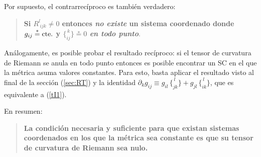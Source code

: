 Por supuesto, el contrarrecíproco es también verdadero:
\begin{quotation}
\textbf{Si $R_{\ ijk}^l\neq0$
entonces \textit{no existe} un sistema coordenado donde $g_{ij}\overset{\ast}{=}{\rm
cte.}$ y $\{ _{ i j}^{\, k}\} \overset{\ast}{=}0$ \textit{en todo punto}}.
\end{quotation}

Análogamente, es posible probar el resultado recíproco: si el tensor de curvatura de Riemann se anula en todo punto entonces es posible encontrar un SC en el que la métrica asuma valores constantes. Para esto, basta aplicar el resultado visto al final de la sección (\ref{sec:RT}) y la identidad $\partial_kg_{ij}\equiv g_{il}\,\{^{\, l} _{jk}\}+g_{jl}\,\{^{\, l} _{ik}\}$, que es equivalente a (\ref{tI1}).

En resumen:
\begin{quotation}
\textbf{La condición necesaria y suficiente para que existan sistemas coordenados en los que la métrica sea constante es que su tensor de curvatura de Riemann sea nulo.}
\end{quotation}
%

